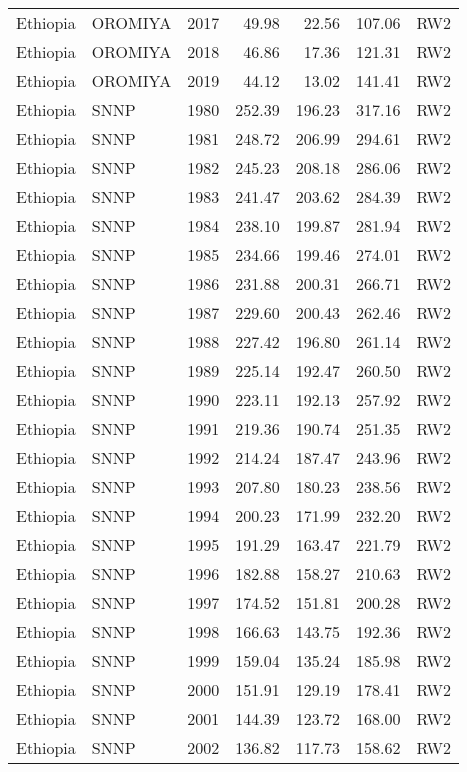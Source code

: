 \begin{longtable}{lllrrrl}
  Ethiopia & OROMIYA & 2017 & 49.98 & 22.56 & 107.06 & RW2 \\ 
  Ethiopia & OROMIYA & 2018 & 46.86 & 17.36 & 121.31 & RW2 \\ 
  Ethiopia & OROMIYA & 2019 & 44.12 & 13.02 & 141.41 & RW2 \\ 
  Ethiopia & SNNP & 1980 & 252.39 & 196.23 & 317.16 & RW2 \\ 
  Ethiopia & SNNP & 1981 & 248.72 & 206.99 & 294.61 & RW2 \\ 
  Ethiopia & SNNP & 1982 & 245.23 & 208.18 & 286.06 & RW2 \\ 
  Ethiopia & SNNP & 1983 & 241.47 & 203.62 & 284.39 & RW2 \\ 
  Ethiopia & SNNP & 1984 & 238.10 & 199.87 & 281.94 & RW2 \\ 
  Ethiopia & SNNP & 1985 & 234.66 & 199.46 & 274.01 & RW2 \\ 
  Ethiopia & SNNP & 1986 & 231.88 & 200.31 & 266.71 & RW2 \\ 
  Ethiopia & SNNP & 1987 & 229.60 & 200.43 & 262.46 & RW2 \\ 
  Ethiopia & SNNP & 1988 & 227.42 & 196.80 & 261.14 & RW2 \\ 
  Ethiopia & SNNP & 1989 & 225.14 & 192.47 & 260.50 & RW2 \\ 
  Ethiopia & SNNP & 1990 & 223.11 & 192.13 & 257.92 & RW2 \\ 
  Ethiopia & SNNP & 1991 & 219.36 & 190.74 & 251.35 & RW2 \\ 
  Ethiopia & SNNP & 1992 & 214.24 & 187.47 & 243.96 & RW2 \\ 
  Ethiopia & SNNP & 1993 & 207.80 & 180.23 & 238.56 & RW2 \\ 
  Ethiopia & SNNP & 1994 & 200.23 & 171.99 & 232.20 & RW2 \\ 
  Ethiopia & SNNP & 1995 & 191.29 & 163.47 & 221.79 & RW2 \\ 
  Ethiopia & SNNP & 1996 & 182.88 & 158.27 & 210.63 & RW2 \\ 
  Ethiopia & SNNP & 1997 & 174.52 & 151.81 & 200.28 & RW2 \\ 
  Ethiopia & SNNP & 1998 & 166.63 & 143.75 & 192.36 & RW2 \\ 
  Ethiopia & SNNP & 1999 & 159.04 & 135.24 & 185.98 & RW2 \\ 
  Ethiopia & SNNP & 2000 & 151.91 & 129.19 & 178.41 & RW2 \\ 
  Ethiopia & SNNP & 2001 & 144.39 & 123.72 & 168.00 & RW2 \\ 
  Ethiopia & SNNP & 2002 & 136.82 & 117.73 & 158.62 & RW2 \\ 

\end{longtable}
